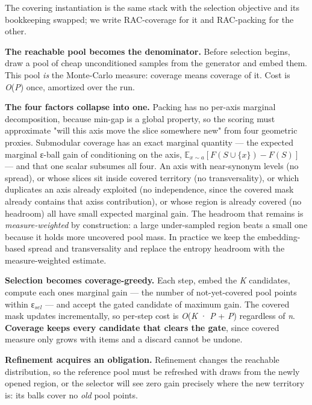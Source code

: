 \documentclass[
  10pt,
]{article}
\theoremstyle{plain}
\theoremstyle{definition}
\begin{document}
The covering instantiation is the same stack with the selection
objective and its bookkeeping swapped; we write RAC-coverage for it and
RAC-packing for the other.

\textbf{The reachable pool becomes the denominator.} Before selection
begins, draw a pool of cheap unconditioned samples from the generator
and embed them. This pool \emph{is} the Monte-Carlo measure: coverage
means coverage of it. Cost is \emph{O}(\emph{P}) once, amortized over
the run.

\textbf{The four factors collapse into one.} Packing has no per-axis
marginal decomposition, because min-gap is a global property, so the
scoring must approximate "will this axis move the slice somewhere new"
from four geometric proxies. Submodular coverage has an exact marginal
quantity --- the expected marginal ε-ball gain of conditioning on the
axis, \(\mathbb{E}_{x \sim a}[F(S \cup \{x\}) - F(S)]\) --- and that one
scalar subsumes all four. An axis with near-synonym levels (no spread),
or whose slices sit inside covered territory (no transversality), or
which duplicates an axis already exploited (no independence, since the
covered mask already contains that axis\textquotesingle s contribution),
or whose region is already covered (no headroom) all have small expected
marginal gain. The headroom that remains is \emph{measure-weighted} by
construction: a large under-sampled region beats a small one because it
holds more uncovered pool mass. In practice we keep the embedding-based
spread and transversality and replace the entropy headroom with the
measure-weighted estimate.

\textbf{Selection becomes coverage-greedy.} Each step, embed the
\emph{K} candidates, compute each one\textquotesingle s marginal gain
--- the number of not-yet-covered pool points within ε\(_{sel}\) --- and
accept the gated candidate of maximum gain. The covered mask updates
incrementally, so per-step cost is \emph{O}(\emph{K} · \emph{P} +
\emph{P}) regardless of \emph{n}. \textbf{Coverage keeps every candidate
that clears the gate}, since covered measure only grows with items and a
discard cannot be undone.

\textbf{Refinement acquires an obligation.} Refinement changes the
reachable distribution, so the reference pool must be refreshed with
draws from the newly opened region, or the selector will see zero gain
precisely where the new territory is: its balls cover no \emph{old} pool
points.
\end{document}
